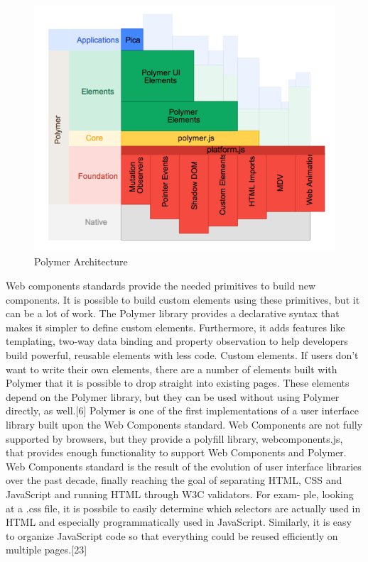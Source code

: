 \begin{figure}[htb]
 \centering
 \includegraphics[width=1.0\linewidth]{images/chapter2/polymer-architecture.png}\hfill
 \caption[Polymer Architecture]{Polymer Architecture}
 \label{fig:fourV}
\end{figure}
Web components standards provide the needed primitives to build new components. It is possible to build custom elements using these primitives, but it can be a lot of work.
\newline
The Polymer library provides a declarative syntax that makes it simpler to define custom elements. Furthermore, it adds features like templating, two-way data binding and property observation to help developers build powerful, reusable elements with less code.
\newline
Custom elements. If users don’t want to write their own elements, there are a number of elements built with Polymer that it is possible to drop straight into existing pages. These elements depend on the Polymer library, but they can be used without using Polymer directly, as well.[6]
\newline
Polymer is one of the first implementations of a user interface library  built upon the Web Components standard. Web Components are not fully supported by browsers, but they provide a polyfill library, webcomponents.js, that provides enough functionality to support Web Components and Polymer.
\newline
Web Components standard is the result of the evolution of user interface libraries over the past decade, finally reaching the goal of separating HTML, CSS and JavaScript and running HTML through W3C validators. For exam- ple, looking at a .css file, it is possbile to easily determine which selectors are actually used in HTML and especially programmatically used in JavaScript. Similarly, it is easy to organize JavaScript code so that everything could be reused efficiently on multiple pages.[23]